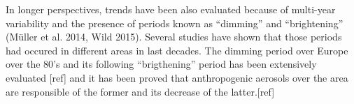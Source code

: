 


In longer perspectives, trends have been also evaluated because of multi-year variability and the presence of periods known as “dimming” and “brightening” (Müller et al. 2014, Wild 2015). Several studies have shown that those periods had occured in different areas in last decades. The dimming period over Europe over the 80's and its following ``brigthening'' period has been extensively evaluated [ref] and it has been proved that anthropogenic aerosols over the area are responsible of the former and its decrease of the latter.[ref]
 

